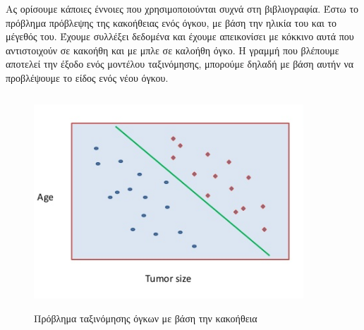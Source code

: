 \documentclass{article}
\begin{document}
Ας ορίσουμε κάποιες έννοιες που χρησιμοποιούνται συχνά στη βιβλιογραφία. Έστω το πρόβλημα πρόβλεψης της κακοήθειας ενός όγκου, με βάση την ηλικία του και το μέγεθός του. Έχουμε συλλέξει δεδομένα και έχουμε απεικονίσει με κόκκινο αυτά που αντιστοιχούν σε κακοήθη και με μπλε σε καλοήθη όγκο. Η γραμμή που βλέπουμε αποτελεί την έξοδο ενός μοντέλου ταξινόμησης, μπορούμε δηλαδή με βάση αυτήν να προβλέψουμε το είδος ενός νέου όγκου.
 \begin{figure}[H]
	\centering			
    \includegraphics[width=0.9\textwidth,height=8cm]{tumor.png}
    \caption[Πρόβλημα ταξινόμησης όγκων με βάση την κακοήθεια]{Πρόβλημα ταξινόμησης όγκων με βάση την κακοήθεια}
 \end{figure}
 
\end{document}
